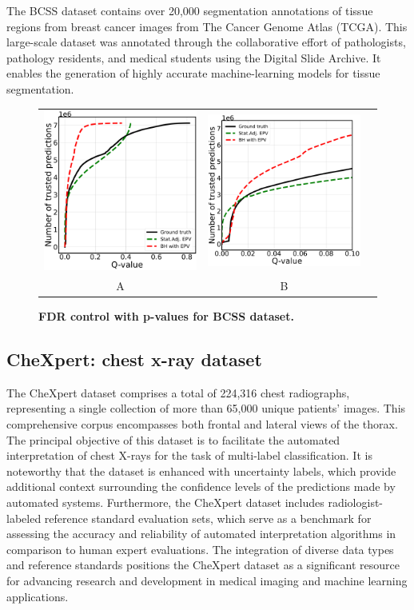 \documentclass{article}
\begin{document}
The BCSS dataset contains over 20,000 segmentation annotations of tissue regions from breast cancer images from The Cancer Genome Atlas (TCGA). This large-scale dataset was annotated through the collaborative effort of pathologists, pathology residents, and medical students using the Digital Slide Archive. It enables the generation of highly accurate machine-learning models for tissue segmentation.


\begin{figure}
	\centering
	\begin{tabular}{ccc}
 		\includegraphics[width=2in]{img/cnn_multi_sa_bcss_fdr_control.pdf} &
		\includegraphics[width=2in]{img/cnn_multi_sa_bcss_fdr_control_loc.pdf}  \\
		A & B 
	\end{tabular}
	\caption{\bf FDR control with p-values for BCSS dataset.}
	\label{fig:bcss}
\end{figure}



\subsection{CheXpert: chest x-ray dataset}

The CheXpert dataset comprises a total of 224,316 chest radiographs, representing a single collection of more than 65,000 unique patients' images. This comprehensive corpus encompasses both frontal and lateral views of the thorax. The principal objective of this dataset is to facilitate the automated interpretation of chest X-rays for the task of multi-label classification. It is noteworthy that the dataset is enhanced with uncertainty labels, which provide additional context surrounding the confidence levels of the predictions made by automated systems. Furthermore, the CheXpert dataset includes radiologist-labeled reference standard evaluation sets, which serve as a benchmark for assessing the accuracy and reliability of automated interpretation algorithms in comparison to human expert evaluations. The integration of diverse data types and reference standards positions the CheXpert dataset as a significant resource for advancing research and development in medical imaging and machine learning applications.
\end{document}
